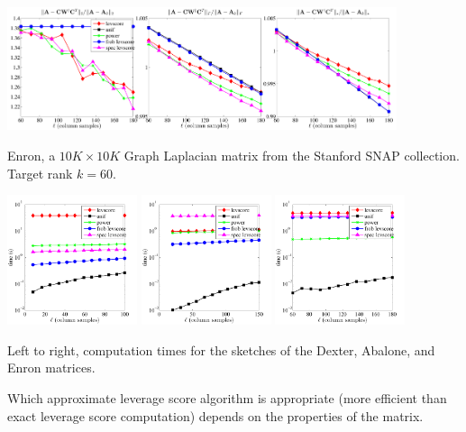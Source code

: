 \documentclass[xcolor=x11names,compress,ignorenonframetext,10pt]{beamer}
\renewcommand{\(}{\begin{columns}}
\renewcommand{\)}{\end{columns}}
\newcommand{\<}[1]{\begin{column}{#1}}
\renewcommand{\>}{\end{column}}
\begin{document}
\begin{frame}
 
  \centerline{\includegraphics[width=4.5in, keepaspectratio=true]{figures/spsd/Enronrank60inexact-methods-nonfixed-rank-errors}}
 Enron, a $10K \times 10K$ Graph Laplacian matrix from the Stanford SNAP collection. Target
 rank $k = 60.$ 
\end{frame}

\begin{frame}
  \centerline{%
    \includegraphics[width=1.5in,keepaspectratio=true]{figures/spsd/Dexterrank8inexact-methods-timings.pdf}%
    \includegraphics[width=1.5in,keepaspectratio=true]{figures/spsd/Abalonesigma1inexact-methods-timings.pdf}%
    \includegraphics[width=1.5in,keepaspectratio=true]{figures/spsd/Enronrank60inexact-methods-timings.pdf}}
Left to right, computation times for the sketches of the Dexter, Abalone, and Enron matrices.

\vspace{0.7em}
Which approximate leverage score algorithm is appropriate (more efficient than exact leverage
score computation) depends on the properties of the matrix.
\end{frame}
\end{document}
